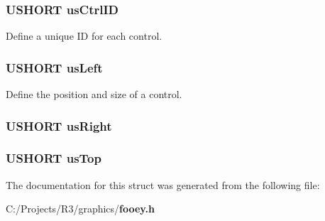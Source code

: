 \subsubsection[{usCtrlID}]{\setlength{\rightskip}{0pt plus 5cm}USHORT {\bf usCtrlID}}\label{struct____gui__base__struct_afe17a073ebbda4e4135de37d41eb21c2}


Define a unique ID for each control. 
\subsubsection[{usLeft}]{\setlength{\rightskip}{0pt plus 5cm}USHORT {\bf usLeft}}\label{struct____gui__base__struct_a634d5cd3aa5edd6eaa3b43e8ffae3f30}


Define the position and size of a control. 
\subsubsection[{usRight}]{\setlength{\rightskip}{0pt plus 5cm}USHORT {\bf usRight}}\label{struct____gui__base__struct_ae0d01293b653d3edf3afe59650712d72}
\subsubsection[{usTop}]{\setlength{\rightskip}{0pt plus 5cm}USHORT {\bf usTop}}\label{struct____gui__base__struct_abe3d3cfc450f732196cc29be49b493f3}


The documentation for this struct was generated from the following file:\begin{DoxyCompactItemize}
\item 
C:/Projects/R3/graphics/{\bf fooey.h}\end{DoxyCompactItemize}
